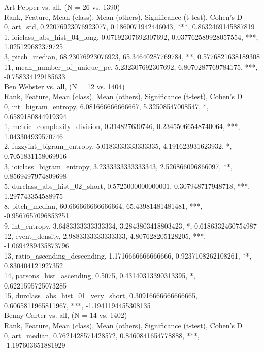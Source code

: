 Art Pepper vs. all, (N = 26 vs. 1390)\\
Rank, Feature, Mean (class), Mean (others), Significance (t-test), Cohen's D\\
0, art_std, 0.22076923076923077, 0.1860071942446043, ***, 0.8632469145887819\\
1, ioiclass_abs_hist_04_long, 0.07192307692307692, 0.037762589928057554, ***, 1.025129682379725\\
3, pitch_median, 68.23076923076923, 65.34640287769784, **, 0.5776821638189308\\
11, mean_number_of_unique_pc, 5.232307692307692, 6.8070287769784175, ***, -0.758334129185633\\
Ben Webster vs. all, (N = 12 vs. 1404)\\
Rank, Feature, Mean (class), Mean (others), Significance (t-test), Cohen's D\\
0, int_bigram_entropy, 6.081666666666667, 5.32508547008547, *, 0.6589180844919394\\
1, metric_complexity_division, 0.314827630746, 0.23455066548740064, ***, 1.043304939570746\\
2, fuzzyint_bigram_entropy, 5.0183333333333335, 4.191623931623932, *, 0.7051831158069916\\
3, ioiclass_bigram_entropy, 3.2333333333333343, 2.526866096866097, **, 0.8569497974809698\\
5, durclass_abs_hist_02_short, 0.5725000000000001, 0.307948717948718, ***, 1.297743354588975\\
8, pitch_median, 60.666666666666664, 65.43981481481481, ***, -0.9567657096853251\\
9, int_entropy, 3.6483333333333334, 3.2843803418803423, *, 0.6186332460754987\\
12, event_density, 2.9883333333333333, 4.807628205128205, ***, -1.0694289435873796\\
13, ratio_ascending_descending, 1.1716666666666666, 0.9237108262108261, **, 0.830404121927352\\
14, parsons_hist_ascending, 0.5075, 0.43140313390313395, *, 0.6221595725073285\\
15, durclass_abs_hist_01_very_short, 0.30916666666666665, 0.6065811965811967, ***, -1.1941194455308135\\
Benny Carter vs. all, (N = 14 vs. 1402)\\
Rank, Feature, Mean (class), Mean (others), Significance (t-test), Cohen's D\\
0, art_median, 0.7621428571428572, 0.8460841654778888, ***, -1.197603651881929\\

